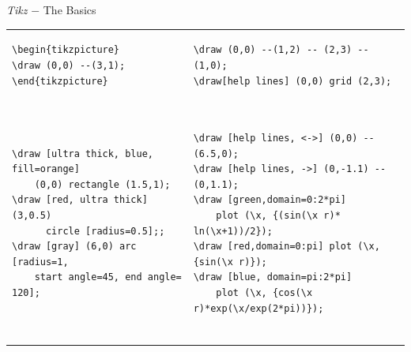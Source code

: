 \documentclass{beamer}\usepackage[]{graphicx}\usepackage[]{color}
\begin{document}
\begin{frame}[fragile]{\emph{\textrm{Tikz}} $-$ The Basics}


\begin{table}\tiny\rmfamily\vspace{-.25in}
\renewcommand{\arraystretch}{-3}
\begin{tabular}[t]{p{4cm}p{6cm}}
\begin{verbatim}
\begin{tikzpicture}
\draw (0,0) --(3,1);
\end{tikzpicture}
\end{verbatim} 

\begin{center}
\begin{tikzpicture}[scale=.6]
\draw (0,0) --(3,1);
\end{tikzpicture}
\end{center}

& \pause
\begin{verbatim}
\draw (0,0) --(1,2) -- (2,3) -- (1,0);
\draw[help lines] (0,0) grid (2,3);
\end{verbatim} 

\begin{center}
\begin{tikzpicture}[scale=.5, yscale=.75]
\draw[help lines] (0,0) grid (2,3);
\draw (0,0) --(1,2) -- (2,3) -- (1,0);
\end{tikzpicture}
\end{center}
\\\pause

\begin{verbatim}
\draw [ultra thick, blue, fill=orange] 
    (0,0) rectangle (1.5,1);
\draw [red, ultra thick] (3,0.5) 
      circle [radius=0.5];;
\draw [gray] (6,0) arc [radius=1, 
    start angle=45, end angle= 120];
\end{verbatim}

\begin{center}
\begin{tikzpicture}[scale=.75]
\draw [blue,fill=orange] (0,0) rectangle (1.5,1);
\draw [red, ultra thick] (3,0.5) circle [radius=0.5];
\draw [gray] (6,0) arc [radius=1, start angle=45, end angle= 120];
\end{tikzpicture}
\end{center}
&\pause
\begin{verbatim}

\draw [help lines, <->] (0,0) -- (6.5,0);
\draw [help lines, ->] (0,-1.1) -- (0,1.1);
\draw [green,domain=0:2*pi]
    plot (\x, {(sin(\x r)* ln(\x+1))/2});
\draw [red,domain=0:pi] plot (\x, {sin(\x r)});
\draw [blue, domain=pi:2*pi] 
    plot (\x, {cos(\x r)*exp(\x/exp(2*pi))});


\end{verbatim}
\end{tabular}
\end{table}
\end{frame}
\end{document}
